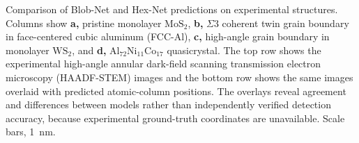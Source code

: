 \caption[Comparison of Blob-Net and Hex-Net predictions on experimental structures]{Comparison of Blob-Net and Hex-Net predictions on experimental structures. Columns show \textbf{a,} pristine monolayer $\mathrm{MoS_2}$, \textbf{b,} $\Sigma3$ coherent twin grain boundary in face-centered cubic aluminum (FCC-Al), \textbf{c,} high-angle grain boundary in monolayer $\mathrm{WS_2}$, and \textbf{d,} $\mathrm{Al_{72}Ni_{11}Co_{17}}$ quasicrystal. The top row shows the experimental high-angle annular dark-field scanning transmission electron microscopy (HAADF-STEM) images and the bottom row shows the same images overlaid with predicted atomic-column positions. The overlays reveal agreement and differences between models rather than independently verified detection accuracy, because experimental ground-truth coordinates are unavailable. Scale bars, 1~nm.}
